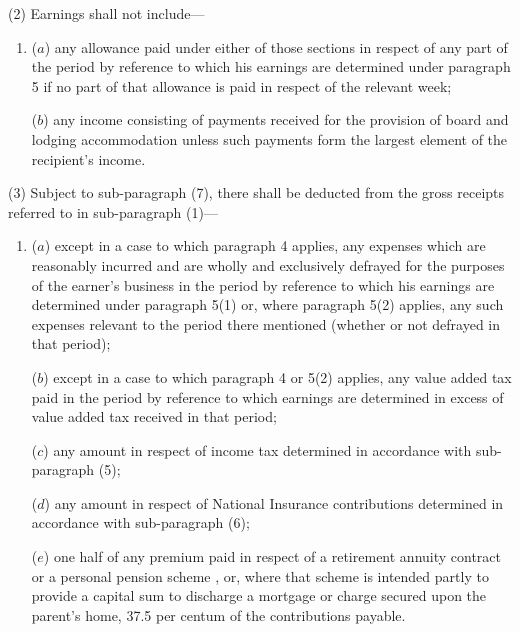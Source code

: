 \documentclass[12pt,a4paper]{article}
\begin{document}
(2) Earnings shall not include—
\begin{enumerate}\item[]
($a$) any allowance paid under either of those sections in respect of any part of the period by reference to which his earnings are determined under paragraph 5 if no part of that allowance is paid in respect of the relevant week;

($b$) any income consisting of payments received for the provision of board and lodging accommodation unless such payments form the largest element of the recipient’s income.
\end{enumerate}

(3) 
Subject to sub-paragraph (7), %
there shall be deducted from the gross receipts referred to in sub-paragraph (1)—
\begin{enumerate}\item[]
($a$) 
except in a case to which paragraph 4 applies, %
any expenses which are reasonably incurred and are wholly and exclusively defrayed for the purposes of the earner’s business in the period by reference to which his earnings are determined under paragraph 5(1) or, where paragraph 5(2) applies, any such expenses relevant to the period there mentioned (whether or not defrayed in that period);

($b$) 
except in a case to which paragraph 4 
  or 5(2)  %
applies, %
any value added tax paid in the period by reference to which earnings are determined in excess of value added tax received in that period;

($c$) any amount in respect of income tax determined in accordance with sub-paragraph (5);

($d$) any amount in respect of National Insurance contributions determined in accordance with sub-paragraph (6);

($e$) one half of any premium paid in respect of a retirement annuity contract or a personal pension scheme%
, or, where that scheme is intended partly to provide a capital sum to discharge a mortgage or charge secured upon the parent’s home, 37.5 per centum of the contributions payable. %
\end{enumerate}
\end{document}
